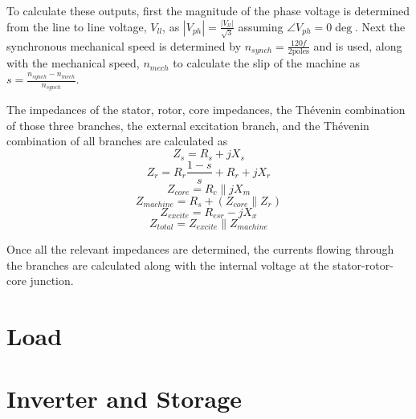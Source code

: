 To calculate these outputs, first the magnitude of the phase voltage is determined from the line to line voltage, $V_{ll}$, as $ \left|V_{ph}\right| = \frac{\left|V_{ll}\right|}{\sqrt{3}} $ assuming $ \angle V_{ph} = 0\deg $. Next the synchronous mechanical speed is determined by $ n_{synch} = \frac{120f}{2\text{poles}} $ and is used, along with the mechanical speed, $n_{mech}$ to calculate the slip of the machine as $ s = \frac{n_{synch} - n_{mech}}{n_{synch}} $.

The impedances of the stator, rotor, core impedances, the Th\'evenin combination of those three branches, the external excitation branch, and the Th\'evenin combination of all branches are calculated as
\begin{equation*}
Z_s = R_s + jX_s
\end{equation*}
\begin{equation*}
Z_r = R_r\frac{1-s}{s} + R_r + jX_r
\end{equation*}
\begin{equation*}
Z_{core} = R_c \parallel jX_m
\end{equation*}
\begin{equation*}
Z_{machine} = R_s + \left(Z_{core} \parallel Z_r\right)
\end{equation*}
\begin{equation*}
Z_{excite} = R_{esr} - jX_x
\end{equation*}
\begin{equation*}
Z_{total} = Z_{excite} \parallel Z_{machine}
\end{equation*}

Once all the relevant impedances are determined, the currents flowing through the branches are calculated along with the internal voltage at the stator-rotor-core junction.
\section{Load}

\section{Inverter and Storage}
